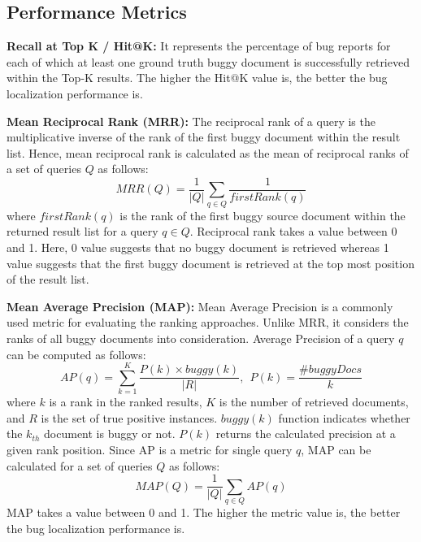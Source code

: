 \documentclass[sigconf,review,anonymous]{acmart}
\begin{document}
\subsection{Performance Metrics}\label{sec:pmetrics}

\textbf{Recall at Top K / Hit@K:} It represents the percentage of bug reports for each of which at least one ground truth buggy document is successfully retrieved within the Top-K results. 
The higher the Hit@K value is, the better the bug localization performance is.

\textbf{Mean Reciprocal Rank (MRR):}
The reciprocal rank of a query is the multiplicative inverse of the rank of the first buggy document within the result list. Hence, mean reciprocal rank is calculated as the mean of reciprocal ranks of a set of queries $Q$ as follows:
\begin{equation*}
MRR(Q) = \frac{1}{\left | Q \right |}\sum_{q\in Q}\frac{1}{firstRank(q)}
\end{equation*}
where $firstRank(q)$ is the rank of the first buggy source document within the returned result list for a query $q\in Q$. Reciprocal rank takes a value between 0 and 1. Here, 0 value suggests that no buggy document is retrieved whereas 1 value suggests that the first buggy document is retrieved at the top most position of the result list.

\textbf{Mean Average Precision (MAP):}
Mean Average Precision is a commonly used metric for evaluating the ranking approaches. Unlike MRR, it considers the ranks of all buggy documents into consideration. 
Average Precision of a query $q$ can be computed as follows:
\begin{equation*}
AP(q)=\sum_{k=1}^{K}\frac{P(k)\times buggy(k)}{|R|},~~P(k)=\frac{\#buggyDocs}{k}
\end{equation*}
where $k$ is a rank in the ranked results, $K$ is the number of retrieved documents, and $R$ is the set of true positive instances. $buggy(k)$ function indicates whether the $k_{th}$ document is buggy or not. $P(k)$ returns the calculated precision at a given rank position. Since AP is a metric for single query $q$, MAP can be calculated for a set of queries $Q$ as follows:
\begin{equation*}
MAP(Q) = \frac{1}{|Q|}\sum_{q\in Q}AP(q)
\end{equation*}
MAP takes a value between 0 and 1. The higher the metric value is, the better the bug localization performance is.
\end{document}
